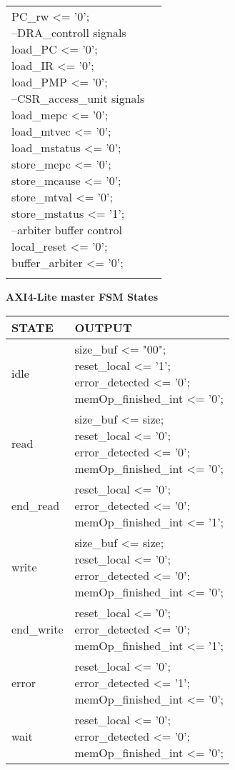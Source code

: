 \begin{small}
\begin{longtable}{| p{} | p{} |}
{		PC\_rw <= '0';\\
		--DRA\_controll signals\\
		load\_PC <= '0';\\
		load\_IR <= '0';\\
		load\_PMP <= '0';\\
		--CSR\_access\_unit signals\\
		load\_mepc <= '0';\\
		load\_mtvec <= '0';\\
		load\_mstatus <= '0';\\
		store\_mepc <= '0';\\
		store\_mcause <= '0';\\
		store\_mtval <= '0';\\
		store\_mstatus <= '1';\\
		--arbiter buffer control\\
		local\_reset <= '0';\\
		buffer\_arbiter <= '0';}\\
	\label{EC_FSM}
\end{longtable}
\end{small}
\clearpage
{\LARGE \textbf{AXI4-Lite master FSM States}}
\begin{longtable}{| p{} | p{} |}
	\hline
	\rowcolor{light-gray}
	\textbf{STATE} & \textbf{OUTPUT} \\
	\hline
	idle & \makecell{size\_buf <= "00";\\
		reset\_local <= '1';\\
		error\_detected <= '0';\\
		memOp\_finished\_int <= '0';}\\
	\hline
	read & \makecell{size\_buf <= size;\\
		reset\_local <= '0';\\
		error\_detected <= '0';\\
		memOp\_finished\_int <= '0';} \\
	\hline
	end\_read & \makecell{
		reset\_local <= '0';\\
		error\_detected <= '0';\\
		memOp\_finished\_int <= '1';} \\
	\hline
	write & \makecell{size\_buf <= size;\\
		reset\_local <= '0';\\
		error\_detected <= '0';\\
		memOp\_finished\_int <= '0';} \\
	\hline
	end\_write & \makecell{
		reset\_local <= '0';\\
		error\_detected <= '0';\\
		memOp\_finished\_int <= '1';} \\
	\hline
	error & \makecell{
		reset\_local <= '0';\\
		error\_detected <= '1';\\
		memOp\_finished\_int <= '0';} \\
	\hline
	wait & \makecell{
		reset\_local <= '0';\\
		error\_detected <= '0';\\
		memOp\_finished\_int <= '0';} \\
\end{longtable}
